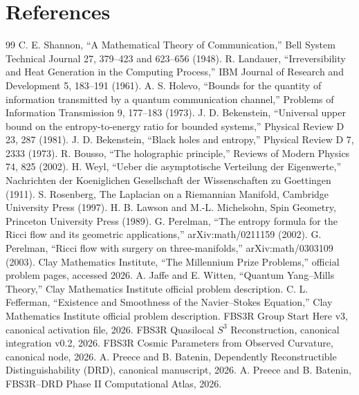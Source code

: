 \documentclass[11pt,a4paper]{article}
\begin{document}
\section{References}
\begin{thebibliography}{99}
 C. E. Shannon, ``A Mathematical Theory of Communication,'' Bell System Technical Journal 27, 379--423 and 623--656 (1948).
 R. Landauer, ``Irreversibility and Heat Generation in the Computing Process,'' IBM Journal of Research and Development 5, 183--191 (1961).
 A. S. Holevo, ``Bounds for the quantity of information transmitted by a quantum communication channel,'' Problems of Information Transmission 9, 177--183 (1973).
 J. D. Bekenstein, ``Universal upper bound on the entropy-to-energy ratio for bounded systems,'' Physical Review D 23, 287 (1981).
 J. D. Bekenstein, ``Black holes and entropy,'' Physical Review D 7, 2333 (1973).
 R. Bousso, ``The holographic principle,'' Reviews of Modern Physics 74, 825 (2002).
 H. Weyl, ``Ueber die asymptotische Verteilung der Eigenwerte,'' Nachrichten der Koeniglichen Gesellschaft der Wissenschaften zu Goettingen (1911).
 S. Rosenberg, The Laplacian on a Riemannian Manifold, Cambridge University Press (1997).
 H. B. Lawson and M.-L. Michelsohn, Spin Geometry, Princeton University Press (1989).
 G. Perelman, ``The entropy formula for the Ricci flow and its geometric applications,'' arXiv:math/0211159 (2002).
 G. Perelman, ``Ricci flow with surgery on three-manifolds,'' arXiv:math/0303109 (2003).
 Clay Mathematics Institute, ``The Millennium Prize Problems,'' official problem pages, accessed 2026.
 A. Jaffe and E. Witten, ``Quantum Yang--Mills Theory,'' Clay Mathematics Institute official problem description.
 C. L. Fefferman, ``Existence and Smoothness of the Navier--Stokes Equation,'' Clay Mathematics Institute official problem description.
 FBS3R Group Start Here v3, canonical activation file, 2026.
 FBS3R Quasilocal $S^3$ Reconstruction, canonical integration v0.2, 2026.
 FBS3R Cosmic Parameters from Observed Curvature, canonical node, 2026.
 A. Preece and B. Batenin, Dependently Reconstructible Distinguishability (DRD), canonical manuscript, 2026.
 A. Preece and B. Batenin, FBS3R--DRD Phase II Computational Atlas, 2026.

\end{thebibliography}
\end{document}
